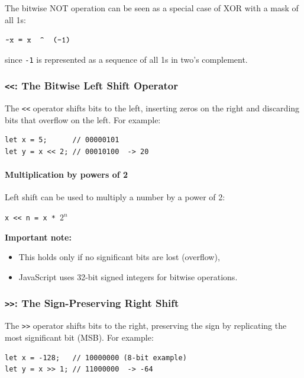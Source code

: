 \documentclass{scrbook}
\begin{document}
The bitwise NOT operation can be seen as a special case of XOR with a mask of all 1s:

\begin{center}
    $\texttt{\textasciitilde x = x \ \string^ \ (-1)}$
\end{center}

since \texttt{-1} is represented as a sequence of all 1s in two's complement.

\bigskip

\subsubsection{\texttt{<<}: The Bitwise Left Shift Operator}

The \texttt{<<} operator shifts bits to the left, inserting zeros on the right and discarding bits that overflow on the left. For example:

\begin{lstlisting}
let x = 5;      // 00000101
let y = x << 2; // 00010100  -> 20
\end{lstlisting}

\paragraph{Multiplication by powers of 2}

Left shift can be used to multiply a number by a power of 2:

\begin{center}
    \texttt{x << n = x * $2^{n}$}
\end{center}

\textbf{Important note:}
\begin{itemize}
    \item This holds only if no significant bits are lost (overflow),
    \item JavaScript uses 32-bit signed integers for bitwise operations.
\end{itemize}

\subsubsection{\texttt{>>}: The Sign-Preserving Right Shift}

The \texttt{>>} operator shifts bits to the right, preserving the sign by replicating the most significant bit (MSB). For example:

\begin{lstlisting}
let x = -128;   // 10000000 (8-bit example)
let y = x >> 1; // 11000000  -> -64
\end{lstlisting}
\end{document}
